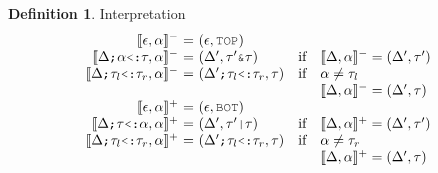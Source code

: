 \documentclass[acmsmall]{acmart}
\theoremstyle{definition}
\newtheorem{definition}{Definition}[section]
\begin{document}
\begin{definition} 
  \label{def:interpretation}
  Interpretation
  \hfill
  \boxed{
    \llbracket\Delta, \alpha \rrbracket^\pm = (\Delta, \tau)
  }
  \\
  \[
  \begin{array}[t]{r@{}c@{}lcl}

      \llbracket \epsilon, \alpha \rrbracket^-
      &\ =\ & 
      (\epsilon, \J{TOP})

      \\

      \llbracket \Delta \J{;}\alpha  \J{<:} \tau, \alpha \rrbracket^- 
      &\ =\ & 
      (\Delta', \tau' \J{\&} \tau)
      &\text{if}& 
      \llbracket \Delta, \alpha \rrbracket^- = (\Delta', \tau')

      \\

      \llbracket \Delta \J{;}\tau_l \J{<:} \tau_r, \alpha \rrbracket^- 
      &\ =\ & 
      (\Delta' \J{;}\tau_l \J{<:} \tau_r, \tau)
      &\text{if}& 
      \begin{array}[t]{@{}l}
        \alpha \neq \tau_l
        \\
        \llbracket \Delta, \alpha \rrbracket^- = (\Delta', \tau)
      \end{array}

      \\

      \llbracket \epsilon, \alpha \rrbracket^+ 
      &\ =\ & 
      (\epsilon, \J{BOT})

      \\

      \llbracket \Delta \J{;} \tau \J{<:} \alpha  , \alpha \rrbracket^+ 
      &\ =\ & 
      (\Delta', \tau' \J{|} \tau)
      &\text{if}& 
      \llbracket \Delta, \alpha \rrbracket^+ = (\Delta', \tau')

      \\

      \llbracket \Delta \J{;}\tau_l \J{<:} \tau_r, \alpha \rrbracket^+ 
      &\ =\ & 
      (\Delta' \J{;}\tau_l \J{<:} \tau_r, \tau)
      &\text{if}& 
      \begin{array}[t]{@{}l}
        \alpha \neq \tau_r
        \\
        \llbracket \Delta, \alpha \rrbracket^+ = (\Delta', \tau)
      \end{array}
  \end{array}
  \]
\end{definition}

\end{document}
